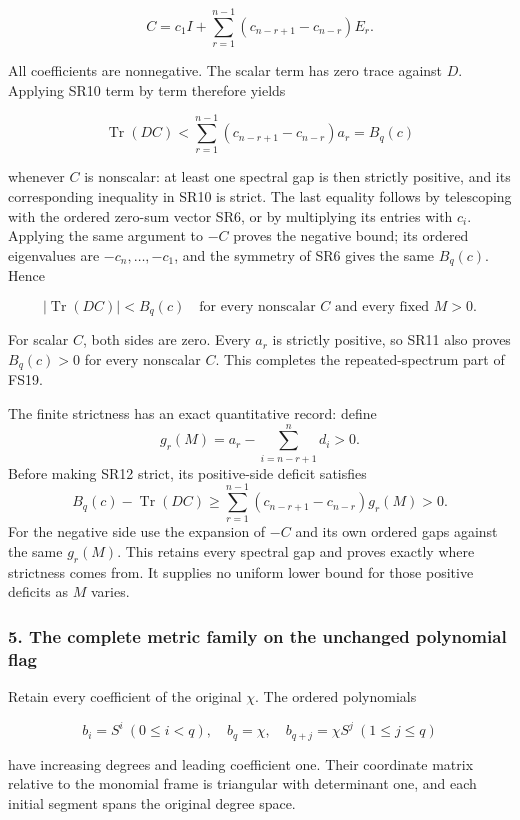 \documentclass{article}
\begin{document}
\[
C=c_1I+\sum_{r=1}^{n-1}
(c_{n-r+1}-c_{n-r})E_r.
\tag{SR11}
\]

All coefficients are nonnegative. The scalar term has zero trace against \(D\). Applying SR10 term by term therefore yields

\[
\operatorname{Tr}(DC)
<\sum_{r=1}^{n-1}(c_{n-r+1}-c_{n-r})a_r=B_q(c)
\tag{SR12}
\]

whenever \(C\) is nonscalar: at least one spectral gap is then strictly positive, and its corresponding inequality in SR10 is strict. The last equality follows by telescoping with the ordered zero-sum vector SR6, or by multiplying its entries with \(c_i\). Applying the same argument to \(-C\) proves the negative bound; its ordered eigenvalues are \(-c_n,\ldots,-c_1\), and the symmetry of SR6 gives the same \(B_q(c)\). Hence

\[
|\operatorname{Tr}(DC)|<B_q(c)
\quad\text{for every nonscalar \(C\) and every fixed \(M>0\)}.
\tag{SR13}
\]

For scalar \(C\), both sides are zero. Every \(a_r\) is strictly positive, so SR11 also proves \(B_q(c)>0\) for every nonscalar \(C\). This completes the repeated-spectrum part of FS19.

The finite strictness has an exact quantitative record: define \[
g_r(M)=a_r-\sum_{i=n-r+1}^{n}d_i>0.
\tag{SR14}
\] Before making SR12 strict, its positive-side deficit satisfies \[
B_q(c)-\operatorname{Tr}(DC)
\ge\sum_{r=1}^{n-1}(c_{n-r+1}-c_{n-r})g_r(M)>0.
\tag{SR15}
\] For the negative side use the expansion of \(-C\) and its own ordered gaps against the same \(g_r(M)\). This retains every spectral gap and proves exactly where strictness comes from. It supplies no uniform lower bound for those positive deficits as \(M\) varies.

\subsubsection{5. The complete metric family on the unchanged polynomial flag}\label{endpoint-four_window_sharpness_review--the-complete-metric-family-on-the-unchanged-polynomial-flag}

Retain every coefficient of the original \(\chi\). The ordered polynomials

\[
b_i=S^i\ (0\le i<q),\quad b_q=\chi,\quad
b_{q+j}=\chi S^j\ (1\le j\le q)
\tag{SR16}
\]

have increasing degrees and leading coefficient one. Their coordinate matrix relative to the monomial frame is triangular with determinant one, and each initial segment spans the original degree space.
\end{document}
